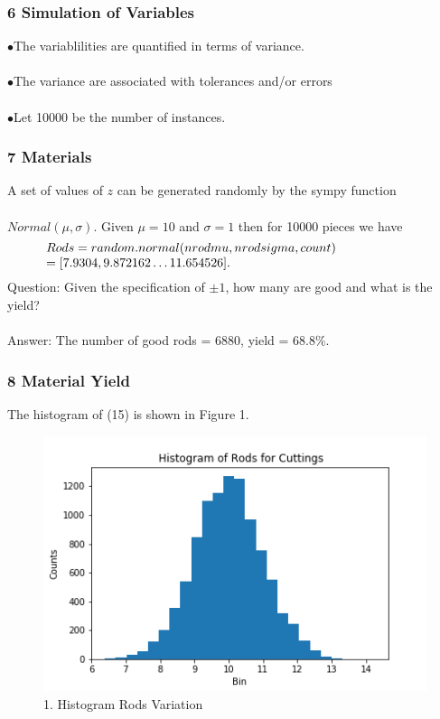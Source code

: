 \documentclass[11pt]{beamer}
\begin{document}
\begin{frame}
\frametitle{6 Simulation of Variables}
\noindent $\bullet$The variablilities are quantified in terms of variance.  \\ \ \\     $\bullet$The variance are associated with tolerances and/or errors \\ \ \\     $\bullet$Let 10000 be the number of instances.

\end{frame}

\begin{frame}
\frametitle{7 Materials}
\noindent A set of values of $z$ can be generated randomly by the sympy function    \\ \ \\  $Normal(\mu, \sigma)$. Given  $\mu = 10 $ and $\sigma = 1 $ then for 10000 pieces we have \\ 
\begin{equation}
\begin{minipage}{300pt}
 $\displaystyle Rods = random.normal(nrodmu, nrodsigma, count) \\ = [7.9304, 9.872162 \dots 11.654526]. $  
\end{minipage}
\end{equation}
\noindent Question: Given the specification of $\pm 1$, how many are good and what is the    yield? \\ \ \\    Answer: The number of good rods = 6880, yield = 68.8\%. 

\end{frame}

\begin{frame}
\frametitle{8 Material Yield}
\noindent The histogram of (15) is shown in Figure 1.
\begin{figure}[H]
\centering\includegraphics[width=0.7\linewidth,height=0.5\textheight]{Fig01}
\caption{1. Histogram Rods Variation}
\label{fig:Fig01}
\end{figure}


\end{frame}
\end{document}
